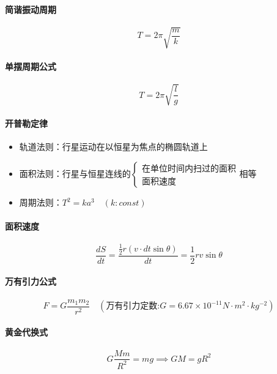 \paragraph{简谐振动周期}
\begin{equation*}
    T=2\pi\sqrt{\frac{m}{k}}
\end{equation*}

\paragraph{单摆周期公式}
\begin{equation*}
    T=2\pi\sqrt{\frac{l}{g}}
\end{equation*}

\paragraph{开普勒定律}
\begin{itemize}
    \item 轨道法则：行星运动在以恒星为焦点的椭圆轨道上
    \item 面积法则：行星与恒星连线的$\begin{cases}\textrm{在单位时间内扫过的面积}\\\textrm{面积速度}\end{cases}$相等
    \item 周期法则：$T^2=ka^3\quad(k:const)$
\end{itemize}

\paragraph{面积速度}
\begin{equation*}
    \frac{dS}{dt}=\frac{\frac12r(v\cdot dt\sin\theta)}{dt}=\frac12rv\sin\theta
\end{equation*}

\paragraph{万有引力公式}
\begin{equation*}
    F=G\frac{m_1m_2}{r^2}\quad(\textrm{万有引力定数:}G=6.67\times10^{-11}N\cdot m^2\cdot kg^{-2})
\end{equation*}

\paragraph{黄金代换式}
\begin{equation*}
    G\frac{Mm}{R^2}=mg\implies
    GM=gR^2
\end{equation*}

